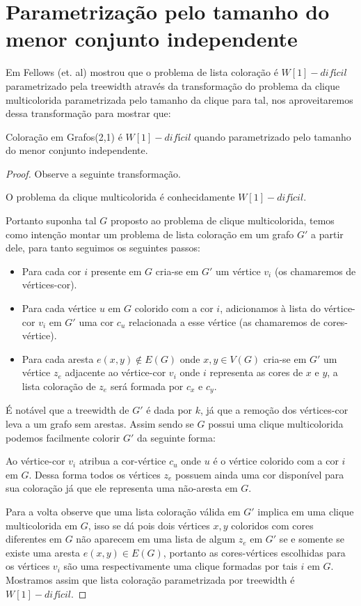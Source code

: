 \section{Parametrização pelo tamanho do menor conjunto independente}
Em \cite{fellows07} Fellows (et. al) mostrou que o problema de lista coloração é $W[1]-difícil$ parametrizado pela treewidth através da transformação do problema da clique multicolorida parametrizada pelo tamanho da clique para tal, nos aproveitaremos dessa transformação para mostrar que:
\begin{teorema}
	Coloração em Grafos(2,1) é $W[1]-difícil$ quando parametrizado pelo tamanho do menor conjunto independente.
\end{teorema}
\begin{proof}
	Observe a seguinte transformação.
	
	O problema da clique multicolorida é conhecidamente $W[1]-difícil$\cite{fellows07}.
	
	Portanto suponha tal $G$ proposto ao problema de clique multicolorida, temos como intenção montar um problema de lista coloração em um grafo $G'$ a partir dele, para tanto seguimos os seguintes passos:
	\begin{itemize}
		\item Para cada cor $i$ presente em $G$ cria-se em $G'$ um vértice $v_i$ (os chamaremos de vértices-cor).
		\item Para cada vértice $u$ em $G$ colorido com a cor $i$, adicionamos à lista do vértice-cor $v_i$ em $G'$ uma cor $c_u$ relacionada a esse vértice (as chamaremos de cores-vértice).
		\item Para cada aresta $e(x,y) \notin E(G)$ onde $x,y \in V(G)$ cria-se em $G'$ um vértice $z_e$ adjacente ao vértice-cor $v_i$ onde $i$ representa as cores de $x$ e $y$, a lista coloração de $z_e$ será formada por $c_x$ e $c_y$.
	\end{itemize}
	É notável que a treewidth de $G'$ é dada por $k$, já que a remoção dos vértices-cor leva a um grafo sem arestas. Assim sendo se $G$ possui uma clique multicolorida podemos facilmente colorir $G'$ da seguinte forma:
	
	Ao vértice-cor $v_i$ atribua a cor-vértice $c_u$ onde $u$ é o vértice colorido com a cor $i$ em $G$. Dessa forma todos os vértices $z_e$ possuem ainda uma cor disponível para sua coloração já que ele representa uma não-aresta em $G$. 
	
	Para a volta observe que uma lista coloração válida em $G'$ implica em uma clique multicolorida em $G$, isso se dá pois dois vértices $x,y$ coloridos com cores diferentes em $G$ não aparecem em uma lista de algum $z_e$ em $G'$ se e somente se existe uma aresta $e(x,y) \in E(G)$, portanto as cores-vértices escolhidas para os vértices $v_i$ são uma respectivamente uma clique formadas por tais $i$ em $G$. Mostramos assim que lista coloração parametrizada por treewidth é $W[1]-difícil$.
	

\end{proof}
